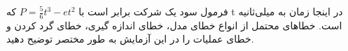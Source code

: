 فرمول سود یک شرکت برابر است با 
$P=\frac{5}{6}t^{3}- et^{2}$
که 
t
در اینجا زمان به میلی‌ثانیه است. خطاهای محتمل از انواع خطای مدل، خطای اندازه گیری، خطای گرد کردن و خطای عملیات را در این آزمایش به طور مختصر توضیح دهید.

\begin{comment}

پاسخ:
\begin{itemize}
    \item خطای مدل: اینکه واقعا سود و زیان از این فرمول پیروی می‌کند یا نه.
    \item خطای ضرب و تفریق(خطای عملیات): چون اعداد در این مثال اعشاری هیتند و این اعشار تا بی‌نهایت ادامه دارد، هنگام ضرب کردن و یا تفریق کردن، ممکن است با خطای ضرب یا تفریق مواجه شویم.
    \item خطای اندازه‌گیری: اگر مقدار t را درست حساب نکیم، مرتکب این نوع خطا شده‌ایم که در واقع ناشی از خطای وسیله و شخص ‌اندازه‌گیر است.
    \item خطای گردکردن: وقتی می‌خوایم $e$ را تقریب بزنیم باید آن را گرد کنیم. این گرد کردن یعنی ایجاد فاصله با مقدار واقعی آن.
\end{itemize}

\end{comment}